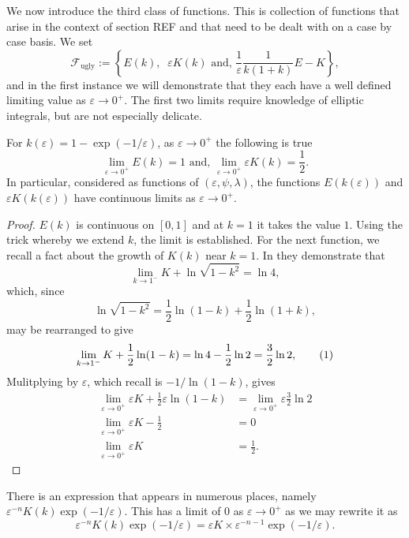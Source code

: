 We now introduce the third class of functions. This is collection of functions that arise in the context of section REF  and that need to be dealt with on a case by case basis. We set
\[
\mathcal{F}_\text{ugly} := \left\{ E(k),\;\; εK(k) \text{ and, } \frac{1}{ε}\frac{1}{k(1+k)} E - K \right\},
\]
and in the first instance we will demonstrate that they each have a well defined limiting value as $ε\to 0^+$. The first two limits require knowledge of elliptic integrals, but are not especially delicate.
\begin{lem}\label{lem:limit_ugly_1}
For $k(ε) = 1 - \exp(-1/ε)$, as $ε\to 0^+$ the following is true
\[
\lim_{ε\to 0^+} E(k) = 1 \text{ and, } \lim_{ε\to 0^+} εK(k) = \frac{1}{2}.
\]
In particular, considered as functions of $(ε,ψ,λ)$, the functions $E(k(ε))$ and $εK(k(ε))$ have continuous limits as $ε \to 0^+$.

\begin{proof}
$E(k)$ is continuous on $[0,1]$ and at $k=1$ it takes the value $1$. Using the trick whereby we extend $k$, the limit is established. For the next function, we recall a fact about the growth of $K(k)$ near $k=1$. In \cite{Anderson} they demonstrate that
\[
\lim_{k \to 1^-} K + \ln\sqrt{1-k^2} = \ln 4,
\]
which, since
\[
\ln\sqrt{1-k^2} = \frac{1}{2}\ln(1-k) + \frac{1}{2}\ln(1+k),
\]
may be rearranged to give
\[
\lim_{k \to 1^-} K + \frac{1}{2}\ln(1-k) = \ln 4 - \frac{1}{2}\ln 2 = \frac{3}{2}\ln 2, \labelthis{eqn:order K}
\]
Mulitplying by $ε$, which recall is $-1/\ln(1-k)$, gives
\begin{align*}
\lim_{ε \to 0^+} εK + \frac{1}{2}ε\ln(1-k) &= \lim_{ε \to 0^+} ε\frac{3}{2}\ln 2 \\
\lim_{ε \to 0^+} εK - \frac{1}{2} &= 0 \\
\lim_{ε \to 0^+} εK &= \frac{1}{2}.
\end{align*}
\end{proof}
\end{lem}

There is an expression that appears in numerous places, namely $
ε^{-n}K(k)\exp(-1/ε)$. This has a limit of $0$ as $ε\to 0^+$ as we may rewrite it as
\[
ε^{-n}K(k)\exp(-1/ε) = εK \times ε^{-n-1}\exp(-1/ε).
\]

